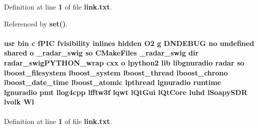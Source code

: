 Definition at line {\bf 1} of file {\bf link.\+txt}.



Referenced by {\bf set()}.

\paragraph[{Wl}]{\setlength{\rightskip}{0pt plus 5cm}usr bin {\bf c} f\+P\+IC fvisibility inlines hidden O2 g D\+N\+D\+E\+B\+UG no undefined shared o \+\_\+radar\+\_\+swig {\bf so} C\+Make\+Files \+\_\+radar\+\_\+swig dir radar\+\_\+swig\+P\+Y\+T\+H\+O\+N\+\_\+wrap cxx o lpython2 lib libgnuradio {\bf radar} {\bf so} lboost\+\_\+filesystem lboost\+\_\+system lboost\+\_\+thread lboost\+\_\+chrono lboost\+\_\+date\+\_\+time lboost\+\_\+atomic lpthread lgnuradio {\bf runtime} lgnuradio {\bf pmt} llog4cpp lfftw3f lqwt l\+Qt\+Gui l\+Qt\+Core {\bf luhd} l\+Soapy\+S\+DR lvolk Wl}\label{soapysdr_2build_2apps_2CMakeFiles_2SoapySDRUtil_8dir_2link_8txt_af7da9d76c5b3c726a2c8ee1338d9258b}


Definition at line {\bf 1} of file {\bf link.\+txt}.

